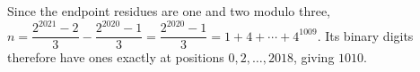 Since the endpoint residues are one and two modulo three, $n=\dfrac{2^{2021}-2}{3}-\dfrac{2^{2020}-1}{3}=\dfrac{2^{2020}-1}{3}=1+4+\cdots+4^{1009}$. Its binary digits therefore have ones exactly at positions $0,2,\ldots,2018$, giving $\boxed{1010}$.
